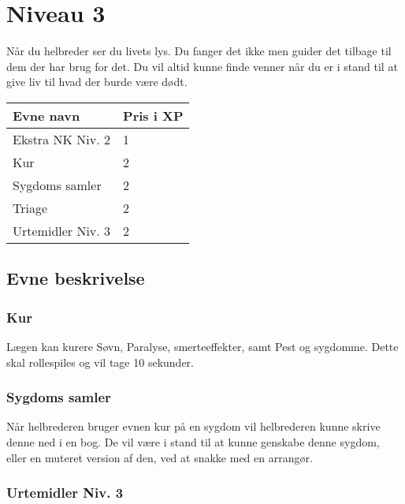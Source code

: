 \chapter{Niveau 3}
Når du helbreder ser du livets lys. Du fanger det ikke men guider det tilbage til dem der har brug for det. Du vil altid kunne finde venner når du er i stand til at give liv til hvad der burde være dødt. 
\begin{table}[H]
    \centering
    \begin{tabular}{|p{}|p{}|}
    \rowcolor{cerulean!80}\hline
        Evne navn & Pris i XP \\\hline
        Ekstra NK Niv. 2 & 1\\\hline
        Kur & 2\\\hline
        Sygdoms samler & 2 \\\hline
        Triage & 2\\\hline
        Urtemidler Niv. 3 & 2 \\\hline
    \end{tabular}
\end{table}
\section{Evne beskrivelse}



\subsection{Kur}
Lægen kan kurere Søvn, Paralyse, smerteeffekter, samt Pest og
sygdomme. Dette skal rollespiles og vil tage 10 sekunder.

\subsection{Sygdoms samler}
Når helbrederen bruger evnen kur på en sygdom vil helbrederen kunne skrive denne ned i en bog. De vil være i stand til at kunne genskabe denne sygdom, eller en muteret version af den, ved at snakke med en arrangør.



\subsection{Urtemidler Niv. 3}

